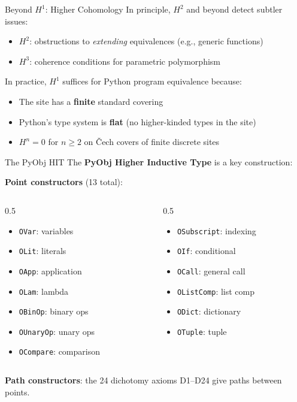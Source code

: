 \documentclass[aspectratio=169,11pt]{beamer}
\begin{document}
\begin{frame}{Beyond $H^1$: Higher Cohomology}
In principle, $H^2$ and beyond detect subtler issues:
\begin{itemize}
\item $H^2$: obstructions to \emph{extending} equivalences (e.g., generic functions)
\item $H^3$: coherence conditions for parametric polymorphism
\end{itemize}

\vspace{0.5em}
In practice, $H^1$ suffices for Python program equivalence because:
\begin{itemize}
\item The site has a \textbf{finite} standard covering
\item Python's type system is \textbf{flat} (no higher-kinded types in the site)
\item $H^n = 0$ for $n \geq 2$ on \v{C}ech covers of finite discrete sites
\end{itemize}
\end{frame}

\begin{frame}{The PyObj HIT}
The \textbf{PyObj Higher Inductive Type} is a key construction:

\vspace{0.3em}
\textbf{Point constructors} (13 total):
\begin{columns}
\begin{column}{0.5\textwidth}
\begin{itemize}
\item \texttt{OVar}: variables
\item \texttt{OLit}: literals
\item \texttt{OApp}: application
\item \texttt{OLam}: lambda
\item \texttt{OBinOp}: binary ops
\item \texttt{OUnaryOp}: unary ops
\item \texttt{OCompare}: comparison
\end{itemize}
\end{column}
\begin{column}{0.5\textwidth}
\begin{itemize}
\item \texttt{OSubscript}: indexing
\item \texttt{OIf}: conditional
\item \texttt{OCall}: general call
\item \texttt{OListComp}: list comp
\item \texttt{ODict}: dictionary
\item \texttt{OTuple}: tuple
\end{itemize}
\end{column}
\end{columns}

\vspace{0.3em}
\textbf{Path constructors}: the 24 dichotomy axioms D1--D24 give paths between points.
\end{frame}
\end{document}

